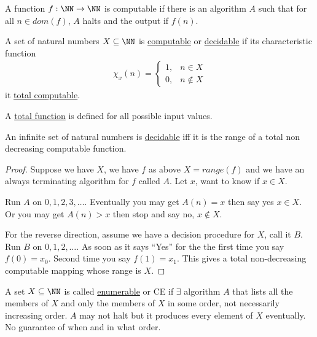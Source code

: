 \documentclass[../598comp.tex]{subfiles}
\begin{document}
\begin{definition}
  A function $f: \NN \to \NN$ is computable if there is an algorithm $A$ such
  that for all $n \in dom(f)$, $A$ halts and the output if $f(n)$.
\end{definition}

\begin{definition}
  A set of natural numbers $X \subseteq \NN$ is \ul{computable} or \ul{decidable}
  if its characteristic function
  \begin{gather*}
    \chi_x(n) =
    \begin{cases}
      1, &n \in X \\
      0, &n \notin X
    \end{cases}
  \end{gather*}
  it \ul{total computable}.
\end{definition}

\begin{definition}
  A \ul{total function} is defined for all possible input values.
\end{definition}

\begin{proposition}
  An infinite set of natural numbers is \ul{decidable} iff it is the range of a
  total non decreasing computable function.
  \begin{proof}
    Suppose we have $X$, we have $f$ as above $X = range(f)$ and we have an
    always terminating algorithm for $f$ called $A$. Let $x$, want to know if $x
    \in X$.

    Run $A$ on $0, 1, 2, 3, \dots$. Eventually you may get $A(n) = x$ then say
    yes $x \in X$. Or you may get $A(n) > x$ then stop and say no, $x \notin X$.

    For the reverse direction, assume we have a decision procedure for $X$, call
    it $B$. Run $B$ on $0, 1, 2, \dots$. As soon as it says ``Yes'' for the the
    first time you say $f(0) = x_0$. Second time you say $f(1) = x_1$. This
    gives a total non-decreasing computable mapping whose range is $X$.
  \end{proof}
\end{proposition}

\begin{definition}[Enumerable]
  A set $X \subseteq \NN$ is called \ul{enumerable} or CE if $\exists$ algorithm
  $A$ that lists all the members of $X$ and only the members of $X$ in some
  order, not necessarily increasing order. $A$ may not halt but it produces
  every element of $X$ eventually. No guarantee of when and in what order.
\end{definition}
\end{document}
